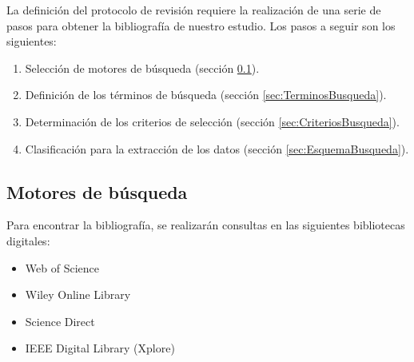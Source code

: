 La definición del protocolo de revisión requiere la realización de una serie de pasos para obtener la bibliografía de nuestro estudio. Los pasos a seguir son los siguientes:
\begin{enumerate}
\item Selección de motores de búsqueda (sección \ref{sec:MotoresBusqueda}).
\item Definición de los términos de búsqueda (sección \ref{sec:TerminosBusqueda}).
\item Determinación de los criterios de selección (sección \ref{sec:CriteriosBusqueda}).
\item Clasificación para la extracción de los datos (sección \ref{sec:EsquemaBusqueda}).
\end{enumerate}


\subsection{Motores de búsqueda}
\label{sec:MotoresBusqueda}
Para encontrar la bibliografía, se realizarán consultas en las siguientes bibliotecas digitales: 
\begin{itemize}
\item Web of Science
\item Wiley Online Library
\item Science Direct
\item IEEE Digital Library (Xplore)
\end{itemize}

